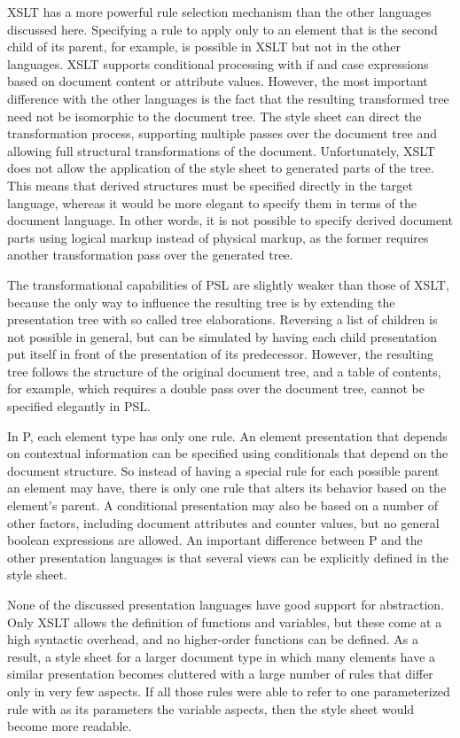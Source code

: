  XSLT has a more powerful rule selection mechanism than the other languages discussed here. Specifying a rule to apply only to an element that is the second child of its parent, for example, is possible in XSLT but not in the other languages. XSLT supports conditional processing with if and case expressions based on document content or attribute values. However, the most important difference with the other languages is the fact that the resulting transformed tree need not be isomorphic to the document tree. The style sheet can direct the transformation process, supporting multiple passes over the document tree and allowing full structural transformations of the document. Unfortunately, XSLT does not allow the application of the style sheet to generated parts of the tree. This means that derived structures must be specified directly in the target language, whereas it would be more elegant to specify them in terms of the document language. In other words, it is not possible to specify derived document parts using logical markup instead of physical markup, as the former requires another transformation pass over the generated tree. 

 The transformational capabilities of PSL are slightly weak\-er than those of XSLT, because the only way to influence the resulting tree is by extending the presentation tree with so called tree elaborations. Reversing a list of children is not possible in general, but can be simulated by having each child presentation put itself in front of the presentation of its predecessor. However, the resulting tree follows the structure of the original document tree, and a table of contents, for example, which requires a double pass over the document tree, cannot be specified elegantly in PSL.

 In P, each element type has only one rule. An element presentation that depends on contextual information can be specified using conditionals that depend on the document structure. So instead of having a special rule for each possible parent an element may have, there is only one rule that alters its behavior based on the element's parent. A conditional presentation may also be based on a number of other factors, including document attributes and counter values, but no general boolean expressions are allowed. An important difference between P and the other presentation languages is that several views can be explicitly defined in the style sheet. 

 None of the discussed presentation languages have good support for abstraction. Only XSLT allows the definition of functions and variables, but these come at a high syntactic overhead, and no higher-order functions can be defined. As a result, a style sheet for a larger document type in which many elements have a similar presentation becomes cluttered with a large number of rules that differ only in very few aspects. If all those rules were able to refer to one parameterized rule with as its parameters the variable aspects, then the style sheet would become more readable.

